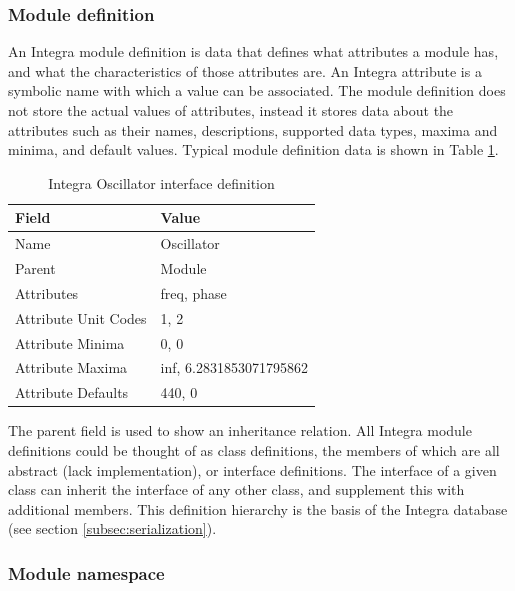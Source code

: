 \documentclass{article}
\begin{document}
\subsubsection{Module definition}\label{subsubsec:module_definition}

An Integra module definition is data that defines what attributes a
module has, and what the characteristics of those attributes are. An
Integra attribute is a symbolic name with which a value can be
associated. The module definition does not store the actual values of
attributes, instead it stores data about the attributes such as their
names, descriptions, supported data types, maxima and minima, and
default values. Typical module definition data is shown in Table
\ref{tab:module_definition}.

\begin{table}
\begin{center}
\begin{tabular}{|l|l|}
\hline
\textbf{Field} & \textbf{Value} \\
\hline
Name  & Oscillator \\
\hline
Parent  & Module \\
\hline
Attributes & freq, phase \\
\hline
Attribute Unit Codes & 1, 2 \\
\hline
Attribute Minima & 0, 0 \\
\hline
Attribute Maxima & inf, 6.2831853071795862 \\
\hline
Attribute Defaults & 440, 0 \\
\hline
\end{tabular} 
\end{center}
\caption{Integra Oscillator interface definition}
\label{tab:module_definition}
\end{table}

The parent field is used to show an inheritance relation. All Integra module definitions could be thought of as class definitions, the members of which are all abstract (lack implementation), or interface definitions. The interface of a given class can inherit the interface of any other class, and supplement this with additional members. This definition hierarchy is the basis of the Integra database (see section \ref{subsec:serialization}). 

\subsubsection{Module namespace}\label{subsubsec:module_namespace}
\end{document}
